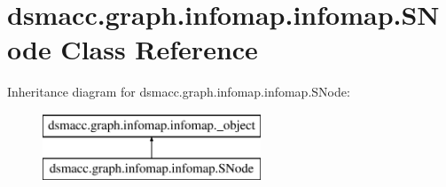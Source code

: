 \hypertarget{classdsmacc_1_1graph_1_1infomap_1_1infomap_1_1SNode}{}\section{dsmacc.\+graph.\+infomap.\+infomap.\+S\+Node Class Reference}
\label{classdsmacc_1_1graph_1_1infomap_1_1infomap_1_1SNode}
Inheritance diagram for dsmacc.\+graph.\+infomap.\+infomap.\+S\+Node\+:\begin{figure}[H]
\begin{center}
\leavevmode
\includegraphics[height=2.000000cm]{classdsmacc_1_1graph_1_1infomap_1_1infomap_1_1SNode}
\end{center}
\end{figure}
